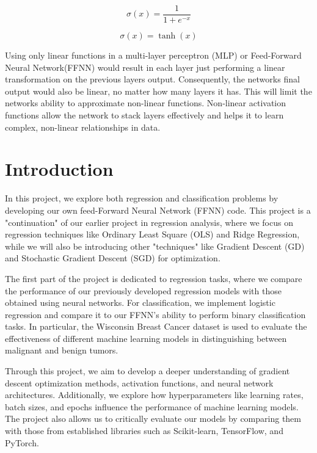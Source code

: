 \begin{equation}
    \sigma(x) = \frac{1}{1 + e^{-x}}
    \label{sigmoid}
\end{equation}

\begin{equation}
      \sigma(x) = \tanh(x)
      \label{tanh}
\end{equation}


Using only linear functions in a multi-layer perceptron (MLP) or Feed-Forward Neural Network(FFNN) would result in each layer just performing a linear transformation on the previous layers output. Consequently, the networks final output would also be linear, no matter how many layers it has. This will limit the networks ability to approximate non-linear functions. Non-linear activation functions allow the network to stack layers effectively and helps it to learn complex, non-linear relationships in data.



\section{Introduction}

In this project, we explore both regression and classification problems by developing our own feed-Forward Neural Network (FFNN) code. This project is a "continuation" of our earlier project in regression analysis, where we focus on regression techniques like Ordinary Least Square (OLS) and Ridge Regression, while we will also be introducing other "techniques" like Gradient Descent (GD) and Stochastic Gradient Descent (SGD) for optimization. 

The first part of the project is dedicated to regression tasks, where we compare the performance of our previously developed regression models with those obtained using neural networks. For classification, we implement logistic regression and compare it to our FFNN’s ability to perform binary classification tasks. In particular, the Wisconsin Breast Cancer dataset is used to evaluate the effectiveness of different machine learning models in distinguishing between malignant and benign tumors.

Through this project, we aim to develop a deeper understanding of gradient descent optimization methods, activation functions, and neural network architectures. Additionally, we explore how hyperparameters like learning rates, batch sizes, and epochs influence the performance of machine learning models. The project also allows us to critically evaluate our models by comparing them with those from established libraries such as Scikit-learn, TensorFlow, and PyTorch.

